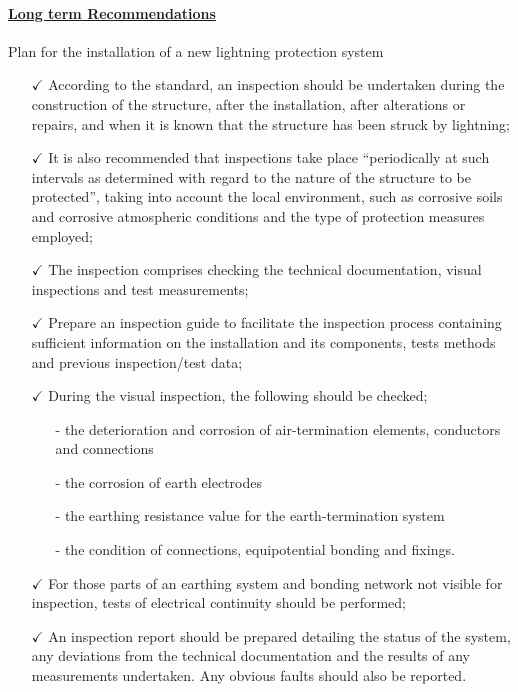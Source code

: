 \paragraph{\underline{Long term Recommendations}}

Plan for the installation of a new lightning protection system 
\begin{itemize}%
	\item [$\checkmark$] According to the standard, an inspection should be undertaken during the construction of the structure, after the installation, after alterations or repairs, and when it is known that the structure has been struck by lightning;
	\item [$\checkmark$] It is also recommended that inspections take place “periodically at such intervals as determined with regard to the nature of the structure to be protected”, taking into account the local environment, such as corrosive soils and corrosive atmospheric conditions and the type of protection measures employed;
	\item [$\checkmark$]The inspection comprises checking the technical documentation, visual inspections and test measurements;
	\item [$\checkmark$]Prepare an inspection guide to facilitate the inspection process containing sufficient information on the installation and its components, tests methods and previous inspection/test data;	
	\item [$\checkmark$]During the visual inspection, the following should be checked;	
	\begin{itemize}
		\item [-] the deterioration and corrosion of air-termination elements, conductors and connections
		\item [-]	the corrosion of earth electrodes
		\item [-]	the earthing resistance value for the earth-termination system
		\item [-]	the condition of connections, equipotential bonding and fixings.
		
	\end{itemize}
	
	\item [$\checkmark$] For those parts of an earthing system and bonding network not visible for inspection, tests of electrical continuity should be performed;
	
	\item [$\checkmark$] An inspection report should be prepared detailing the status of the system, any deviations from the technical documentation and the results of any measurements undertaken. Any obvious faults should also be reported.
\end{itemize}

